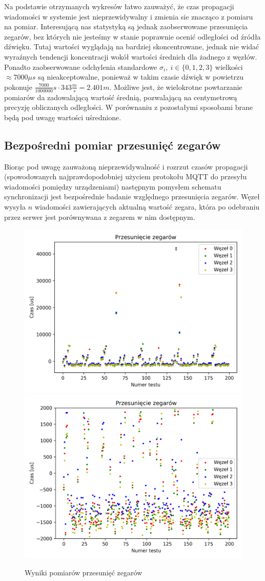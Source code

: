 Na podstawie otrzymanych wykresów łatwo zauważyć, że czas propagacji wiadomości w systemie jest nieprzewidywalny i zmienia sie znacząco z pomiaru na pomiar. Interesującą nas statystyką są jednak zaobserwowane przesunięcia zegarów, bez których nie jesteśmy w stanie poprawnie ocenić odległości od źródła dźwięku. Tutaj wartości wyglądają na bardziej skoncentrowane, jednak nie widać wyraźnych tendencji koncentracji wokół wartości średnich dla żadnego z węzłów. Ponadto zaobserwowane odchylenia standardowe $\sigma_i,\ i \in \{0,1,2,3\}$ wielkości $\approx 7000 \mu s$ są nieakceptowalne, ponieważ w takim czasie dźwięk w powietrzu pokonuje $\frac{7000}{1000000}s \cdot 343\frac{m}{s} = 2.401m$. Możliwe jest, że wielokrotne powtarzanie pomiarów da zadowalającą wartość średnią, pozwalającą na centymetrową precyzję obliczanych odległości. W porównaniu z pozostałymi sposobami brane będą pod uwagę wartości uśrednione.

\subsection{Bezpośredni pomiar przesunięć zegarów}\label{sec:time_deltas_sync}

Biorąc pod uwagę zauważoną nieprzewidywalność i rozrzut czasów propagacji (spowodowanych najprawdopodobniej użyciem protokołu MQTT do przesyłu wiadomości pomiędzy urządzeniami) następnym pomysłem schematu synchronizacji jest bezpośrednie badanie względnego przesunięcia zegarów. Węzeł wysyła $n$ wiadomości zawierających aktualną wartość zegara, która po odebraniu przez serwer jest porównywana z zegarem w nim dostępnym.

\begin{figure}[h]
\centering
    \includegraphics[width=.49\textwidth]{pics/time_deltas/time_deltas.png}
    \includegraphics[width=.49\textwidth]{pics/time_deltas/time_deltas_close.png}
\caption{Wyniki pomiarów przesunięć zegarów}
\label{pic:offsets_deltas}
\end{figure}

